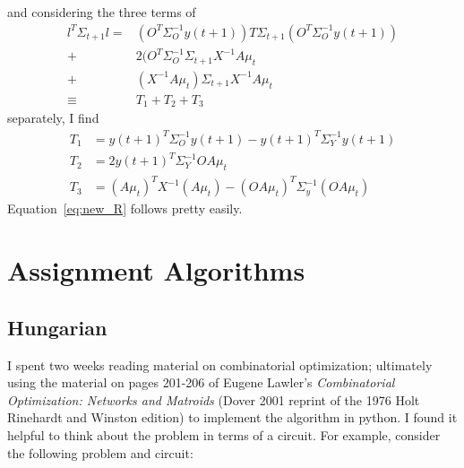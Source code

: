 \documentclass[12pt]{article}
\newcommand{\ti}[2]{{#1}{(#2)}}                         %
\begin{document}
and considering the three terms of
\begin{align*}
  l^T \Sigma_{t+1} l = & (O^T\Sigma_O^{-1} \ti{y}{t+1})T \Sigma_{t+1}
  (O^T\Sigma_O^{-1} \ti{y}{t+1}) \\
  + & 2(O^T\Sigma_O^{-1} \Sigma_{t+1} X^{-1}A\mu_t \\
  + & (X^{-1}A\mu_t)\Sigma_{t+1} X^{-1}A\mu_t \\
  \equiv & T_1+T_2+T_3
\end{align*}
separately, I find
\begin{align*}
  T_1 &= \ti{y}{t+1}^T \Sigma_O^{-1} \ti{y}{t+1} - \ti{y}{t+1}^T
  \Sigma_Y^{-1} \ti{y}{t+1} \\
  T_2 &= 2 \ti{y}{t+1}^T \Sigma_Y^{-1} OA\mu_t \\
  T_3 &= (A\mu_t)^T X^{-1} (A\mu_t) - (OA\mu_t)^T
  \Sigma_y^{-1}(OA\mu_t)
\end{align*}
Equation~\eqref{eq:new_R} follows pretty easily.

\section{Assignment Algorithms}
\label{sec:assignment}

\subsection{Hungarian}
\label{sec:hungarian}

I spent two weeks reading material on combinatorial optimization;
ultimately using the material on pages 201-206 of Eugene Lawler's
\emph{Combinatorial Optimization: Networks and Matroids} (Dover 2001
reprint of the 1976 Holt Rinehardt and Winston edition) to implement
the algorithm in python.  I found it helpful to think about the
problem in terms of a circuit.  For example, consider the following
problem and circuit:
\end{document}

